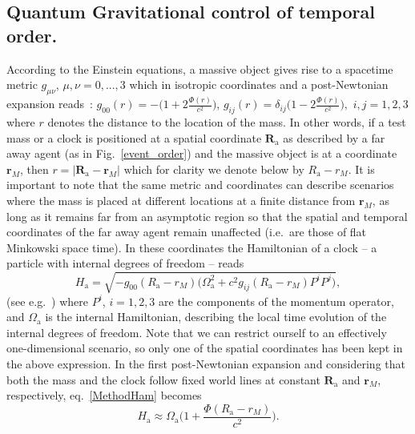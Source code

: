 \documentclass[a4paper,11pt]{article}
\newcommand{\be}{\begin{equation}}
\newcommand{\ee}[1]{\label{#1} \end{equation}}
\begin{document}
\subsection*{Quantum Gravitational control of temporal order.}\label{QG-SWITCH}
According to the Einstein equations, a massive object %
gives rise to a spacetime metric $g_{\mu\nu}$, $\mu, \nu=0,...,3$ which in isotropic coordinates and a post-Newtonian expansion reads~\cite{WeinbergGR}: $g_\mathrm{00}(r)=-\big(1+2\frac{\Phi(r)}{c^2}\big)$,
$g_{ij}(r)=\delta_{ij}\big(1-2\frac{\Phi(r)}{c^2}\big),$ $i,j=1,2,3$
where $r$ denotes the distance to the location of the mass. In other words, if a test mass or a clock is positioned at a spatial coordinate $\mathbf{R}_\mathrm{a}$ as described by a far away agent (as in Fig.~\ref{event_order})
and the massive object is at a coordinate $\mathbf{r}_M$, then $r = | \mathbf{R}_\mathrm{a}-\mathbf{r}_M|$ which for clarity we denote below by $R_\mathrm{a}-{r}_M$. It is important to note that the same metric and coordinates can describe scenarios  where the mass is placed at different locations at a finite distance from $\mathbf{r}_M$, as long as it remains far from an asymptotic region so that the spatial and temporal coordinates of the far away agent remain unaffected (i.e.\ are those of flat Minkowski space time). %
In these coordinates the Hamiltonian of a clock -- a particle with internal degrees of freedom -- reads %
\be
H_\mathrm{a}=\sqrt{-g_\mathrm{00}(R_\mathrm{a}-r_M)\big(\Omega_\mathrm{a}^2+c^2g_{ij}(R_\mathrm{a}-r_M)P^iP^j\big)},
\ee{MethodHam}
(see e.g.~\cite{zych2015quantumEEP, Castro:2017EntangledClocks,zych2018gravitational}) where $P^i$, $i=1,2,3$ are the components of the momentum operator, and $\Omega_\mathrm{a}$ is the internal Hamiltonian, %
describing {the} local time evolution of the internal degrees of freedom. %
Note that we can restrict ourself to an effectively one-dimensional scenario, so only one of the spatial coordinates has been kept in the above expression. In the first post-Newtonian expansion and considering that both the mass and the clock follow fixed world lines at constant $\mathbf R_\mathrm{a}$ and $\mathbf r_M$, respectively, eq.~\eqref{MethodHam} becomes
\be
H_\mathrm{a}\approx \Omega_\mathrm{a}\big(1+\frac{\Phi(R_\mathrm{a}-r_M)}{c^2}\big).
\ee{HA_approx}
\end{document}

